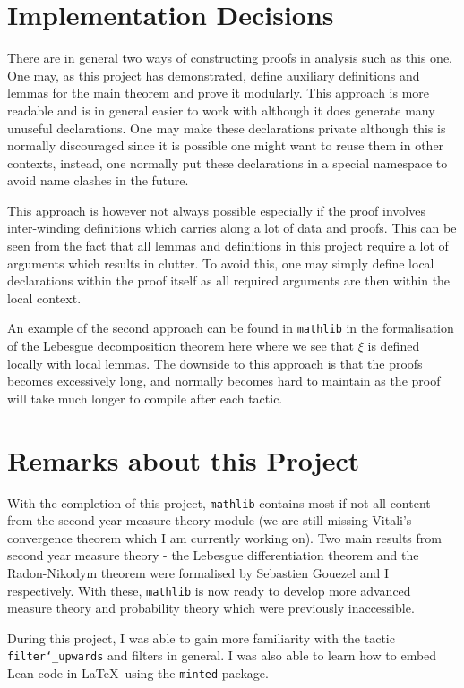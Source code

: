 \documentclass[]{article}
\theoremstyle{definition}
\begin{document}
\section*{Implementation Decisions}

There are in general two ways of constructing proofs in analysis such as this one. 
One may, as this project has demonstrated, define auxiliary definitions and lemmas 
for the main theorem and prove it modularly. This approach is more readable and 
is in general easier to work with although it does generate many unuseful 
declarations. One may make these declarations private although this is normally 
discouraged since it is possible one might want to reuse them in other contexts, 
instead, one normally put these declarations in a special namespace to avoid 
name clashes in the future.

This approach is however not always possible especially if the proof involves 
inter-winding definitions which carries along a lot of data and proofs. This can 
be seen from the fact that all lemmas and definitions in this project require 
a lot of arguments which results in clutter. To avoid this, one may simply 
define local declarations within the proof itself as all required arguments are 
then within the local context. 

An example of the second approach can be found in \texttt{mathlib} in the formalisation 
of the Lebesgue decomposition theorem 
\href{https://github.com/leanprover-community/mathlib/blob/master/src/measure_theory/decomposition/lebesgue.lean#L604}{here}
where we see that \(\xi\) is defined locally with local lemmas. The downside to this 
approach is that the proofs becomes excessively long, and normally becomes hard 
to maintain as the proof will take much longer to compile after each tactic.  

\section*{Remarks about this Project}

With the completion of this project, \texttt{mathlib} contains most if not all 
content from the second year measure theory module (we are still
missing Vitali's convergence theorem which I am currently working on). Two main 
results from second year measure theory - the Lebesgue differentiation theorem 
and the Radon-Nikodym theorem were formalised by Sebastien Gouezel and I 
respectively. With these, \texttt{mathlib} is now ready to develop more advanced 
measure theory and probability theory which were previously inaccessible.

During this project, I was able to gain more familiarity with the tactic 
\texttt{filter\char`_upwards} and filters in general. I was also able to learn
how to embed Lean code in \LaTeX \ using the \texttt{minted} package. 
\end{document}
